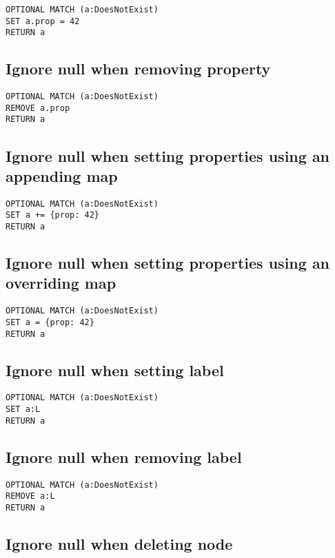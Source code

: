\begin{lstlisting}
OPTIONAL MATCH (a:DoesNotExist)
SET a.prop = 42
RETURN a
\end{lstlisting}

\subsection{Ignore null when removing property}

\begin{lstlisting}
OPTIONAL MATCH (a:DoesNotExist)
REMOVE a.prop
RETURN a
\end{lstlisting}

\subsection{Ignore null when setting properties using an appending map}

\begin{lstlisting}
OPTIONAL MATCH (a:DoesNotExist)
SET a += {prop: 42}
RETURN a
\end{lstlisting}

\subsection{Ignore null when setting properties using an overriding map}

\begin{lstlisting}
OPTIONAL MATCH (a:DoesNotExist)
SET a = {prop: 42}
RETURN a
\end{lstlisting}

\subsection{Ignore null when setting label}

\begin{lstlisting}
OPTIONAL MATCH (a:DoesNotExist)
SET a:L
RETURN a
\end{lstlisting}

\subsection{Ignore null when removing label}

\begin{lstlisting}
OPTIONAL MATCH (a:DoesNotExist)
REMOVE a:L
RETURN a
\end{lstlisting}

\subsection{Ignore null when deleting node}

